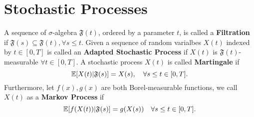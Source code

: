 \section{Stochastic Processes}

\begin{definition}
A sequence of $\sigma$-algebra $\mathfrak{F}(t)$, ordered by a parameter $t$, is called a \textbf{Filtration} if $\mathfrak{F}(s)\subseteq\mathfrak{F}(t),\forall s\le t$. Given a sequence of random varialbes $X(t)$ indexed by $t\in[0,T]$ is called an \textbf{Adapted Stochastic Process} if $X(t)$ is $\mathfrak{F}(t)$-measurable $\forall t\in[0,T]$. A stochastic process $X(t)$ is called \textbf{Martingale} if 
\begin{equation}
\mathbb{E}[X(t)|\mathfrak{F}(s)]=X(s),\quad\forall s\le t\in[0,T].
\end{equation}
Furthermore, let $f(x),g(x)$ are both Borel-measurable functions, we call $X(t)$ as a \textbf{Markov Process} if 
\begin{equation}
\mathbb{E}[f(X(t))|\mathfrak{F}(s)]=g(X(s))\quad\forall s\le t\in[0,T].
\end{equation} 
\end{definition}

